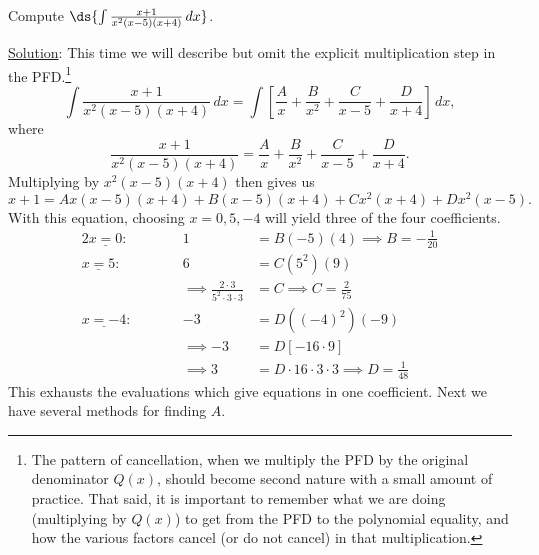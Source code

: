 \bex Compute $\ds{\int\frac{x+1}{x^2(x-5)(x+4)}\,dx}$.

\underline{Solution}: This time we will describe but
omit the explicit multiplication
step in the PFD.\footnote{%
The pattern of cancellation, when we multiply the PFD by the original
denominator $Q(x)$, should become second nature with a small amount
of practice. That said, it is important to remember what we are doing
(multiplying by $Q(x)$) to get from the PFD to the polynomial equality,
and how the various factors cancel (or do not cancel) in that multiplication.
}
$$\int\frac{x+1}{x^2(x-5)(x+4)}\,dx
  =\int\left[\frac{A}x+\frac{B}{x^2}+\frac{C}{x-5}+\frac{D}{x+4}\right]\,dx,$$
where 
$$\frac{x+1}{x^2(x-5)(x+4)}
=\frac{A}x+\frac{B}{x^2}+\frac{C}{x-5}+\frac{D}{x+4}.$$
Multiplying by $x^2(x-5)(x+4)$ then gives us
\begin{equation}x+1=Ax(x-5)(x+4)+B(x-5)(x+4)+Cx^2(x+4)+Dx^2(x-5).
  \label{PolyEqualityForPFD3}\end{equation}
With this equation, choosing $x=0,5,-4$ will yield three of the
four coefficients.
\begin{alignat*}{2}
\underline{x=0}:&\qquad&1&=B(-5)(4)\implies\boxed{B=-\frac1{20}}\\
\underline{x=5}:&&6&=C(5^2)(9)\\
          &&\implies\frac{2\cdot3}{5^2\cdot3\cdot3}
                   &=C\implies\boxed{C=\frac2{75}}\\
\underline{x=-4}:&\qquad&-3&=D((-4)^2)(-9)\\
              &&\implies-3&=D[-16\cdot9]\\
              &&\implies 3&=D\cdot16\cdot3\cdot3\implies
                     \boxed{D=\frac1{48}} 
\end{alignat*}
This exhausts the evaluations which give equations in one coefficient.
Next we have several methods for finding $A$.

